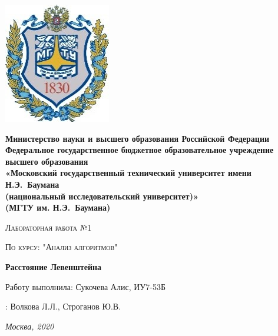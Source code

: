 
\begin{titlepage}
		\noindent \begin{minipage}{0.15\textwidth}
		\includegraphics[width=\linewidth]{img/b_logo}
	\end{minipage}
	\noindent\begin{minipage}{0.9\textwidth}\centering
		\textbf{Министерство науки и высшего образования Российской Федерации}\\
		\textbf{Федеральное государственное бюджетное образовательное учреждение высшего образования}\\
		\textbf{«Московский государственный технический университет имени Н.Э.~Баумана}\\
		\textbf{(национальный исследовательский университет)»}\\
		\textbf{(МГТУ им. Н.Э.~Баумана)}
	\end{minipage}

	\vspace{3cm}
	\centering
	{\scshape\Large Лабораторная работа №1\par}
	\vspace{0.5cm}	
	{\scshape\Large По курсу: "Анализ алгоритмов"\par}
	\vspace{1.5cm}
	{\huge\bfseries Расстояние Левенштейна\par}
	\vspace{2cm}
	\Large Работу выполнила: Сукочева Алис, ИУ7-53Б\par
	\vspace{0.5cm}
	:  Волкова Л.Л., Строганов Ю.В.\par



	\vfill
	\large \textit {Москва, 2020} \par
\end{titlepage}
